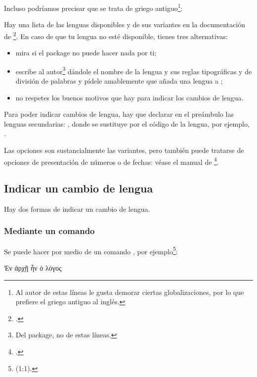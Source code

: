 Incluso podríamos precisar que se trata de griego antiguo\footnote{Al autor de estas líneas le gusta demorar ciertas globalizaciones, por lo que prefiere el griego antiguo al inglés.}: 

\begin{latexcode}
\setmainlanguage[variant=ancient]{greek}
\end{latexcode}

Hay una lista de las lenguas disponibles y de sus variantes en la documentación de \footcite{polyglossia}. En caso de que tu lengua no esté disponible, tienes tres alternativas:
\begin{itemize}
\item mira si el package  no puede hacer nada por ti;
\item escribe al autor\footnote{Del package, no de estas líneas.} dándole el nombre de la lengua y sus reglas tipográficas y de división de palabras y pídele amablemente que añada una lengua a ;
\item no respetes los buenos motivos que hay para indicar los cambios de lengua.
\end{itemize}

Para poder indicar cambios de lengua, hay que declarar en el preámbulo las lenguas secundarias: 
, donde  se sustituye por el código de la lengua, por ejemplo,  .

Las opciones son sustancialmente las variantes, pero también puede tratarse de opciones de presentación de números o de fechas: véase el manual de \footcite{polyglossia_options}.

\subsection{Indicar un cambio de lengua}\label{changerlang}

Hay dos formas de indicar un cambio de lengua.

\subsubsection{Mediante un comando}

Se puede hacer por medio de un comando 
, por ejemplo\footnote{(1:1).}: 

\begin{latexcode}
\textgreek[variant=ancient]{Ἐν ἀρχῇ ἦν ὁ λόγος}
\end{latexcode}

